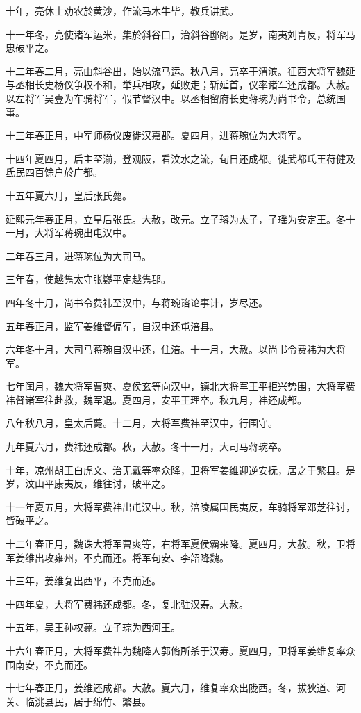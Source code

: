 \documentclass[12pt,UTF8]{ctexbook}
\begin{document}
十年，亮休士劝农於黄沙，作流马木牛毕，教兵讲武。

十一年冬，亮使诸军运米，集於斜谷口，治斜谷邸阁。是岁，南夷刘胄反，将军马忠破平之。

十二年春二月，亮由斜谷出，始以流马运。秋八月，亮卒于渭滨。征西大将军魏延与丞相长史杨仪争权不和，举兵相攻，延败走；斩延首，仪率诸军还成都。大赦。以左将军吴壹为车骑将军，假节督汉中。以丞相留府长史蒋琬为尚书令，总统国事。

十三年春正月，中军师杨仪废徙汉嘉郡。夏四月，进蒋琬位为大将军。

十四年夏四月，后主至湔，登观阪，看汶水之流，旬日还成都。徙武都氐王苻健及氐民四百馀户於广都。

十五年夏六月，皇后张氏薨。

延熙元年春正月，立皇后张氏。大赦，改元。立子璿为太子，子瑶为安定王。冬十一月，大将军蒋琬出屯汉中。

二年春三月，进蒋琬位为大司马。

三年春，使越隽太守张嶷平定越隽郡。

四年冬十月，尚书令费祎至汉中，与蒋琬谘论事计，岁尽还。

五年春正月，监军姜维督偏军，自汉中还屯涪县。

六年冬十月，大司马蒋琬自汉中还，住涪。十一月，大赦。以尚书令费祎为大将军。

七年闰月，魏大将军曹爽、夏侯玄等向汉中，镇北大将军王平拒兴势围，大将军费祎督诸军往赴救，魏军退。夏四月，安平王理卒。秋九月，祎还成都。

八年秋八月，皇太后薨。十二月，大将军费祎至汉中，行围守。

九年夏六月，费祎还成都。秋，大赦。冬十一月，大司马蒋琬卒。

十年，凉州胡王白虎文、治无戴等率众降，卫将军姜维迎逆安抚，居之于繁县。是岁，汶山平康夷反，维往讨，破平之。

十一年夏五月，大将军费祎出屯汉中。秋，涪陵属国民夷反，车骑将军邓芝往讨，皆破平之。

十二年春正月，魏诛大将军曹爽等，右将军夏侯霸来降。夏四月，大赦。秋，卫将军姜维出攻雍州，不克而还。将军句安、李韶降魏。

十三年，姜维复出西平，不克而还。

十四年夏，大将军费祎还成都。冬，复北驻汉寿。大赦。

十五年，吴王孙权薨。立子琮为西河王。

十六年春正月，大将军费祎为魏降人郭脩所杀于汉寿。夏四月，卫将军姜维复率众围南安，不克而还。

十七年春正月，姜维还成都。大赦。夏六月，维复率众出陇西。冬，拔狄道、河关、临洮县民，居于绵竹、繁县。
\end{document}
